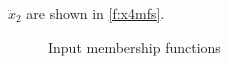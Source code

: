 $\ddot{x}_2$ are shown in \cref{f:x4mfs}.  \begin{figure} \begin{subfigmatrix}{2}   \end{subfigmatrix} \caption{Input membership
functions}\label{f:mfs} \end{figure}

